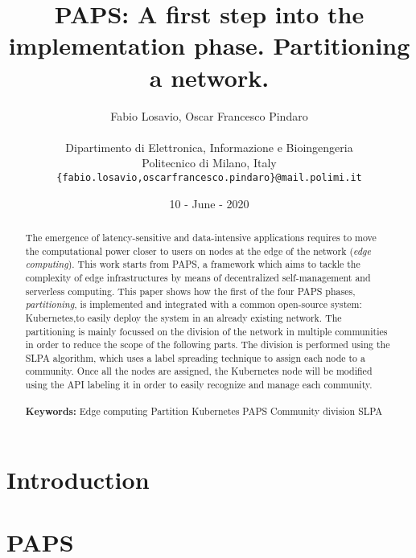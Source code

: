\documentclass{article} %
\title{\textbf{\huge{PAPS: A first step into the implementation phase. Partitioning a network.}}}
\author{\color{black}Fabio Losavio, Oscar Francesco Pindaro \\ \\
        Dipartimento di Elettronica, Informazione e Bioingengeria \\
        Politecnico di Milano, Italy \\
        \texttt{\{fabio.losavio,oscarfrancesco.pindaro\}@mail.polimi.it}}
\date{10 - June - 2020}
\begin{document}
\maketitle

\begin{abstract}
    The emergence of latency-sensitive and data-intensive applications requires to move the 
    computational power closer to users on nodes at the edge of the network (\textit{edge computing}).
    This work starts from PAPS, a framework which aims to tackle the complexity of edge 
    infrastructures by means of decentralized self-management and serverless computing. This paper
    shows how the first of the four PAPS phases, \textit{partitioning}, is implemented and integrated
    with a common open-source system: Kubernetes,to easily deploy the system in an already
    existing network. The partitioning is mainly focussed on the division of the network in multiple 
    communities in order to reduce the scope of the following parts. The division is performed using 
    the SLPA algorithm, which uses a label spreading technique to assign each node to a
    community. Once all the nodes are assigned, the Kubernetes node will be modified using the API 
    labeling it in order to easily recognize and manage each community.
    \\ \\
    \textbf{Keywords:} Edge computing \textbf{\textperiodcentered} Partition 
    \textbf{\textperiodcentered} Kubernetes \textbf{\textperiodcentered} PAPS
    \textbf{\textperiodcentered} Community division \textbf{\textperiodcentered} SLPA
    
\end{abstract}
{{\section{Introduction}\label{sect:intro}}}




{{\section{PAPS}\label{sect:paps}}}

\end{document}
